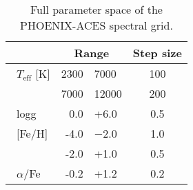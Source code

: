 
\begin{table}
    \centering
    \caption{Full parameter space of the PHOENIX-ACES spectral grid.}
    \begin{tabular}{lr@{ -- }lc}  %
        \toprule
        & \multicolumn{2}{c}{Range}       & Step size\\
        \midrule
        \ \(T_{\textrm{eff}}\) [K] &  2300 & 7000  & 100 \\
        &  7000 & 12000 & 200 \\
        \  logg     &  0.0 & +6.0   & 0.5 \\
        \ [Fe/H]   &  -4.0 & $-$2.0  & 1.0 \\
        &  -2.0 & +1.0  & 0.5 \\
        \  \(\alpha\)/Fe &  -0.2 & +1.2  & 0.2 \\
        \bottomrule
    \end{tabular} \label{tab:phoenix}
\end{table}
